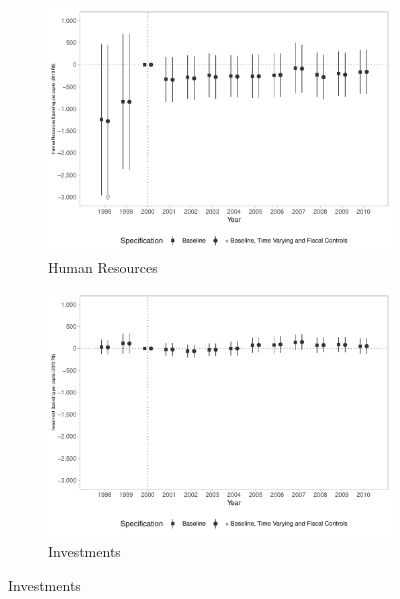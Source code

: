 \begin{figure}[h!]
    \begin{center}
    \caption{Effects Public Spending per capita - By Type}\label{fig:7}
    \begin{subfigure}{0.32\textwidth}
        \centering
        \caption{\scriptsize Human Resources}\label{fig:7a}
        \includegraphics[width=\textwidth]{plots/finbra_desp_pessoal_pcapita_dist_ec29_baseline_dist_ec29_baseline_7.pdf}
    \end{subfigure}
    \begin{subfigure}{0.32\textwidth}
        \centering
        \caption{\scriptsize Investments}\label{fig:7b}
        \includegraphics[width=\textwidth]{plots/finbra_desp_investimento_pcapita_dist_ec29_baseline_dist_ec29_baseline_7.pdf}
    \end{subfigure}

\end{center}
\end{figure}

